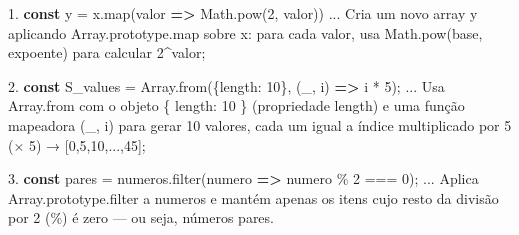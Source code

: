 \documentclass[
  portuguese,
  letterpaper,
  DIV=11,
  numbers=noendperiod]{scrreprt}
\newenvironment{Shaded}{\begin{snugshade}}{\end{snugshade}}
\newcommand{\AttributeTok}[1]{\textcolor[rgb]{0.40,0.45,0.13}{#1}}
\newcommand{\BuiltInTok}[1]{\textcolor[rgb]{0.00,0.23,0.31}{#1}}
\newcommand{\DataTypeTok}[1]{\textcolor[rgb]{0.68,0.00,0.00}{#1}}
\newcommand{\DecValTok}[1]{\textcolor[rgb]{0.68,0.00,0.00}{#1}}
\newcommand{\FloatTok}[1]{\textcolor[rgb]{0.68,0.00,0.00}{#1}}
\newcommand{\FunctionTok}[1]{\textcolor[rgb]{0.28,0.35,0.67}{#1}}
\newcommand{\KeywordTok}[1]{\textcolor[rgb]{0.00,0.23,0.31}{\textbf{#1}}}
\newcommand{\NormalTok}[1]{\textcolor[rgb]{0.00,0.23,0.31}{#1}}
\newcommand{\OperatorTok}[1]{\textcolor[rgb]{0.37,0.37,0.37}{#1}}
\begin{document}
\begin{Shaded}
\begin{Highlighting}[]
\FloatTok{1.}  \KeywordTok{const}\NormalTok{ y }\OperatorTok{=}\NormalTok{ x}\OperatorTok{.}\FunctionTok{map}\NormalTok{(valor }\KeywordTok{=\textgreater{}} \BuiltInTok{Math}\OperatorTok{.}\FunctionTok{pow}\NormalTok{(}\DecValTok{2}\OperatorTok{,}\NormalTok{ valor))}
\OperatorTok{...}
\NormalTok{Cria um novo array y aplicando }\BuiltInTok{Array}\OperatorTok{.}\AttributeTok{prototype}\OperatorTok{.}\AttributeTok{map}\NormalTok{ sobre x}\OperatorTok{:}\NormalTok{ para cada valor}\OperatorTok{,}\NormalTok{ usa }\BuiltInTok{Math}\OperatorTok{.}\FunctionTok{pow}\NormalTok{(base}\OperatorTok{,}\NormalTok{ expoente) para calcular }\DecValTok{2}\OperatorTok{\^{}}\NormalTok{valor}\OperatorTok{;}

\FloatTok{2.} \KeywordTok{const}\NormalTok{ S\_values }\OperatorTok{=} \BuiltInTok{Array}\OperatorTok{.}\FunctionTok{from}\NormalTok{(\{}\DataTypeTok{length}\OperatorTok{:} \DecValTok{10}\NormalTok{\}}\OperatorTok{,}\NormalTok{ (\_}\OperatorTok{,}\NormalTok{ i) }\KeywordTok{=\textgreater{}}\NormalTok{ i }\OperatorTok{*} \DecValTok{5}\NormalTok{)}\OperatorTok{;}
\OperatorTok{...}
\NormalTok{Usa }\BuiltInTok{Array}\OperatorTok{.}\AttributeTok{from}\NormalTok{ com o objeto \{ }\DataTypeTok{length}\OperatorTok{:} \DecValTok{10}\NormalTok{ \} (propriedade length) e uma função }\FunctionTok{mapeadora}\NormalTok{ (\_}\OperatorTok{,}\NormalTok{ i) para gerar }\DecValTok{10}\NormalTok{ valores}\OperatorTok{,}\NormalTok{ cada um igual a índice multiplicado por }\DecValTok{5}\NormalTok{ (× }\DecValTok{5}\NormalTok{) → [}\DecValTok{0}\OperatorTok{,}\DecValTok{5}\OperatorTok{,}\DecValTok{10}\OperatorTok{,...,}\DecValTok{45}\NormalTok{]}\OperatorTok{;}

\FloatTok{3.} \KeywordTok{const}\NormalTok{ pares }\OperatorTok{=}\NormalTok{ numeros}\OperatorTok{.}\FunctionTok{filter}\NormalTok{(numero }\KeywordTok{=\textgreater{}}\NormalTok{ numero }\OperatorTok{\%} \DecValTok{2} \OperatorTok{===} \DecValTok{0}\NormalTok{)}\OperatorTok{;}  
\OperatorTok{...}
\NormalTok{Aplica }\BuiltInTok{Array}\OperatorTok{.}\AttributeTok{prototype}\OperatorTok{.}\AttributeTok{filter}\NormalTok{ a numeros e mantém apenas os itens cujo resto da divisão por }\DecValTok{2}\NormalTok{ (}\OperatorTok{\%}\NormalTok{) é zero — ou seja}\OperatorTok{,}\NormalTok{ números pares}\OperatorTok{.}
\end{Highlighting}
\end{Shaded}
\end{document}
